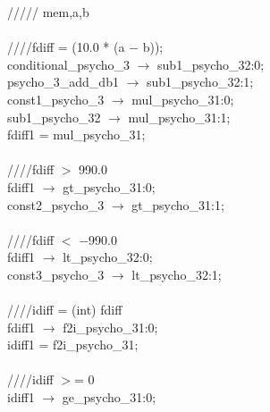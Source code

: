 {   \hspace*{2em}///// mem,a,b \\
   \\
   \hspace*{2em}////fdiff = (10.0 * (a $-$ b)); \\
   \hspace*{2em}conditional\_psycho\_3 $\rightarrow$ sub1\_psycho\_32:0; \\
   \hspace*{2em}psycho\_3\_add\_db1 $\rightarrow$ sub1\_psycho\_32:1; \\
   \hspace*{2em}const1\_psycho\_3 $\rightarrow$ mul\_psycho\_31:0; \\
   \hspace*{2em}sub1\_psycho\_32 $\rightarrow$ mul\_psycho\_31:1; \\
   \hspace*{2em}fdiff1 = mul\_psycho\_31; \\
   \\
   \hspace*{2em}////fdiff $>$ 990.0 \\
   \hspace*{2em}fdiff1 $\rightarrow$ gt\_psycho\_31:0; \\
   \hspace*{2em}const2\_psycho\_3 $\rightarrow$ gt\_psycho\_31:1; \\
   \\
   \hspace*{2em}////fdiff $<$ $-$990.0 \\
   \hspace*{2em}fdiff1 $\rightarrow$ lt\_psycho\_32:0; \\
   \hspace*{2em}const3\_psycho\_3 $\rightarrow$ lt\_psycho\_32:1; \\
   \\
   \hspace*{2em}////idiff = (int) fdiff \\
   \hspace*{2em}fdiff1 $\rightarrow$ f2i\_psycho\_31:0; \\
   \hspace*{2em}idiff1 = f2i\_psycho\_31; \\
   \\
   \hspace*{2em}////idiff $>$= 0 \\
   \hspace*{2em}idiff1 $\rightarrow$ ge\_psycho\_31:0; \\
}
